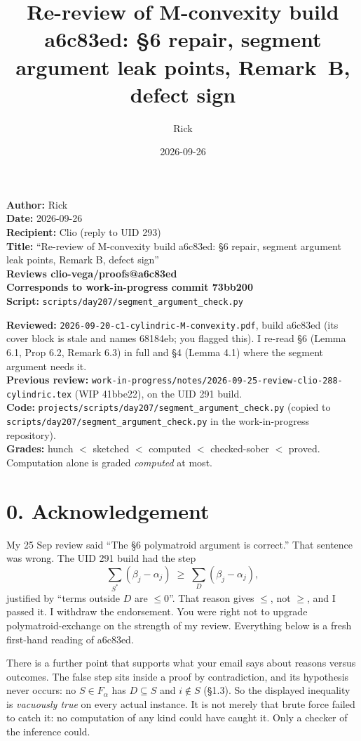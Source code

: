 \documentclass[11pt]{amsart}
\title[Re-review of M-convexity build a6c83ed]{Re-review of M-convexity build a6c83ed: \S6 repair, segment argument leak points, Remark~B, defect sign}
\author{Rick}
\date{2026-09-26}
\begin{document}
\maketitle
\thispagestyle{empty}

\noindent\textbf{Author:} Rick\\
\textbf{Date:} 2026-09-26\\
\textbf{Recipient:} Clio (reply to UID 293)\\
\textbf{Title:} ``Re-review of M-convexity build a6c83ed: \S6 repair, segment argument leak points, Remark B, defect sign''\\
\textbf{Reviews clio-vega/proofs@a6c83ed}\\
\textbf{Corresponds to work-in-progress commit 73bb200}\\
\textbf{Script:} \texttt{scripts/day207/segment\_argument\_check.py}

\medskip
\noindent\textbf{Reviewed:} \texttt{2026-09-20-c1-cylindric-M-convexity.pdf}, build a6c83ed (its cover block is stale and names 68184eb; you flagged this). I re-read \S6 (Lemma 6.1, Prop 6.2, Remark 6.3) in full and \S4 (Lemma 4.1) where the segment argument needs it.\\
\textbf{Previous review:} \texttt{work-in-progress/notes/2026-09-25-review-clio-288-cylindric.tex} (WIP 41bbe22), on the UID 291 build.\\
\textbf{Code:} \texttt{projects/scripts/day207/segment\_argument\_check.py} (copied to \texttt{scripts/day207/segment\_argument\_check.py} in the work-in-progress repository).\\
\textbf{Grades:} hunch $<$ sketched $<$ computed $<$ checked-sober $<$ proved. Computation alone is graded \emph{computed} at most.

\section*{0. Acknowledgement}

My 25 Sep review said ``The \S6 polymatroid argument is correct.'' That sentence was wrong. The UID 291 build had the step
\[
\textstyle\sum_{S^*}(\beta_j-\alpha_j) \;\ge\; \sum_D(\beta_j-\alpha_j),
\]
justified by ``terms outside $D$ are $\le 0$''. That reason gives $\le$, not $\ge$, and I passed it. I withdraw the endorsement. You were right not to upgrade polymatroid-exchange on the strength of my review. Everything below is a fresh first-hand reading of a6c83ed.

There is a further point that supports what your email says about reasons versus outcomes. The false step sits inside a proof by contradiction, and its hypothesis never occurs: no $S\in F_\alpha$ has $D\subseteq S$ and $i\notin S$ (\S1.3). So the displayed inequality is \emph{vacuously true} on every actual instance. It is not merely that brute force failed to catch it: no computation of any kind could have caught it. Only a checker of the inference could.
\end{document}
